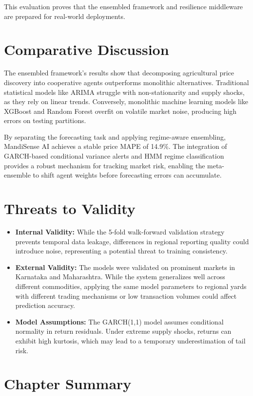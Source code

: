 \documentclass[12pt,a4paper]{report}
\theoremstyle{definition}
\theoremstyle{remark}
\begin{document}
This evaluation proves that the ensembled framework and resilience middleware are prepared for real-world deployments.

\section{Comparative Discussion}

The ensembled framework's results show that decomposing agricultural price discovery into cooperative agents outperforms monolithic alternatives. Traditional statistical models like ARIMA struggle with non-stationarity and supply shocks, as they rely on linear trends. Conversely, monolithic machine learning models like XGBoost and Random Forest overfit on volatile market noise, producing high errors on testing partitions.

By separating the forecasting task and applying regime-aware ensembling, MandiSense AI achieves a stable price MAPE of 14.9\%. The integration of GARCH-based conditional variance alerts and HMM regime classification provides a robust mechanism for tracking market risk, enabling the meta-ensemble to shift agent weights before forecasting errors can accumulate.

\section{Threats to Validity}

\begin{itemize}
    \item \textbf{Internal Validity:} While the 5-fold walk-forward validation strategy prevents temporal data leakage, differences in regional reporting quality could introduce noise, representing a potential threat to training consistency.
    \item \textbf{External Validity:} The models were validated on prominent markets in Karnataka and Maharashtra. While the system generalizes well across different commodities, applying the same model parameters to regional yards with different trading mechanisms or low transaction volumes could affect prediction accuracy.
    \item \textbf{Model Assumptions:} The GARCH(1,1) model assumes conditional normality in return residuals. Under extreme supply shocks, returns can exhibit high kurtosis, which may lead to a temporary underestimation of tail risk.
\end{itemize}

\section{Chapter Summary}
\end{document}
